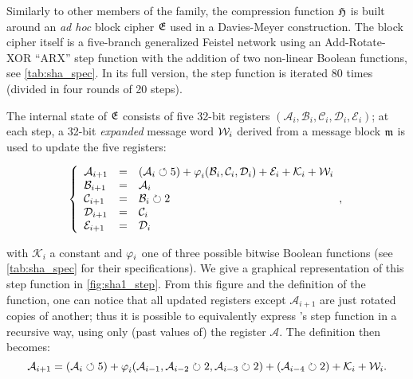 Similarly to other members of the \mdsha family, the compression function $\operatorname{\mathfrak{H}}$ is built around an \emph{ad hoc} block cipher $\operatorname{\mathfrak{E}}$ used in a Davies-Meyer construction.
The block cipher itself is a five-branch generalized Feistel network using an Add-Rotate-XOR ``ARX'' step function with the addition of two non-linear Boolean functions, see \autoref{tab:sha_spec}.
In its full version, the step function is iterated 80 times (divided in four rounds of 20 steps).

The internal state of $\operatorname{\mathfrak{E}}$ consists of five 32-bit registers $(\mathcal{A}_i, \mathcal{B}_i, \mathcal{C}_i, \mathcal{D}_i, \mathcal{E}_i)$; at each step, a 32-bit \emph{expanded} message word $\mathcal{W}_i$ derived from
a message block $\mathfrak{m}$
is used to update the five registers:

\[
\left\{
\begin{array}{lcl}
\mathcal{A}_{i+1} & = & (\mathcal{A}_i \circlearrowleft 5) + \operatorname{\varphi}_i(\mathcal{B}_i,\mathcal{C}_i,\mathcal{D}_i) + \mathcal{E}_i + \mathcal{K}_i + \mathcal{W}_i\\
\mathcal{B}_{i+1} & = & \mathcal{A}_i\\
\mathcal{C}_{i+1} & = & \mathcal{B}_i \circlearrowright 2 \\
\mathcal{D}_{i+1} & = & \mathcal{C}_i \\
\mathcal{E}_{i+1} & = & \mathcal{D}_i \\
\end{array},
\right.	
\]

\noindent with $\mathcal{K}_i$ a constant and $\operatorname{\varphi}_i$ one of three possible bitwise Boolean functions (see \autoref{tab:sha_spec} for their specifications).
We give a graphical representation of this step function in \autoref{fig:sha1_step}.
From this figure and the definition of the function, one can notice that all updated registers except $\mathcal{A}_{i+1}$ are just rotated copies of another;
thus it is possible to equivalently express \shaone's step function in a recursive way, using only (past values of) the register $\mathcal{A}$. The definition then becomes:
\begin{equation}
\label{eq:rec_step}
\mathcal{A}_{i+1} = (\mathcal{A}_i \circlearrowleft 5) + \operatorname{\varphi}_i(\mathcal{A}_{i-1},\mathcal{A}_{i-2}\circlearrowright 2,\mathcal{A}_{i-3}\circlearrowright 2) + (\mathcal{A}_{i-4}\circlearrowright 2) + \mathcal{K}_i + \mathcal{W}_i.
\end{equation}

